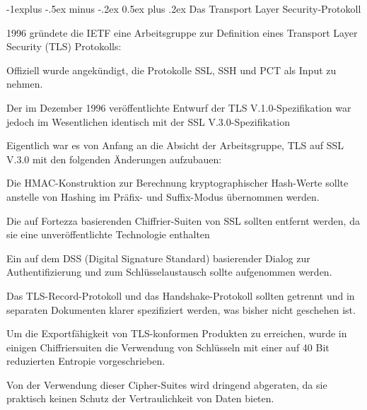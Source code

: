\documentclass[a4paper]{article}
\makeatletter
\renewcommand{\subsection}{\@startsection{subsection}{2}{0mm}%
 {-1explus -.5ex minus -.2ex}%
 {0.5ex plus .2ex}%
 {\normalfont\normalsize\bfseries}}
\makeatother
\begin{document}
\begin{multicols}{3}
      \subsection{Das Transport Layer Security-Protokoll}
      \begin{itemize*}
            \item 1996 gründete die IETF eine Arbeitsgruppe zur Definition eines Transport Layer Security (TLS) Protokolls:
            \begin{itemize*}
                  \item Offiziell wurde angekündigt, die Protokolle SSL, SSH und PCT als Input zu nehmen.
                  \item Der im Dezember 1996 veröffentlichte Entwurf der TLS V.1.0-Spezifikation war jedoch im Wesentlichen identisch mit der SSL V.3.0-Spezifikation
            \end{itemize*}
            \item Eigentlich war es von Anfang an die Absicht der Arbeitsgruppe, TLS auf SSL V.3.0 mit den folgenden Änderungen aufzubauen:
            \begin{itemize*}
                  \item Die HMAC-Konstruktion zur Berechnung kryptographischer Hash-Werte sollte anstelle von Hashing im Präfix- und Suffix-Modus übernommen werden.
                  \item Die auf Fortezza basierenden Chiffrier-Suiten von SSL sollten entfernt werden, da sie eine unveröffentlichte Technologie enthalten
                  \item Ein auf dem DSS (Digital Signature Standard) basierender Dialog zur Authentifizierung und zum Schlüsselaustausch sollte aufgenommen werden.
                  \item Das TLS-Record-Protokoll und das Handshake-Protokoll sollten getrennt und in separaten Dokumenten klarer spezifiziert werden, was bisher nicht geschehen ist.
            \end{itemize*}
            \item Um die Exportfähigkeit von TLS-konformen Produkten zu erreichen, wurde in einigen Chiffriersuiten die Verwendung von Schlüsseln mit einer auf 40 Bit reduzierten Entropie vorgeschrieben.
            \begin{itemize*}
                  \item Von der Verwendung dieser Cipher-Suites wird dringend abgeraten, da sie praktisch keinen Schutz der Vertraulichkeit von Daten bieten.
            \end{itemize*}

\end{itemize*}
\end{multicols}
\end{document}
